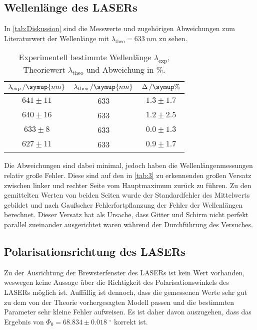 \subsection{Wellenlänge des LASERs}
In \autoref{tab:Diskussion} sind die Messwerte und zugehörigen Abweichungen zum Literaturwert der Wellenlänge mit $\lambda_\text{theo} = \SI{633}{nm}$ \cite{eichler} zu sehen.
\begin{table}[H]
    \centering
    \caption{Experimentell bestimmte Wellenlänge $\lambda_\text{exp}$, Theoriewert $\lambda_\text{theo}$ und Abweichung in \%.}
    \begin{tabular}{c c c}
        \toprule
        {$\lambda_\text{exp}\,/\symup{nm}$} & {$\lambda_\text{theo}\,/\symup{nm}$} & {$\Delta\,/\symup{\%}$}\\
        \midrule
        {$641 \pm 11$} & 633 & {$1.3 \pm 1.7$} \\
        {$640 \pm 16$} & 633 & {$1.2 \pm 2.5$} \\
        {$633 \pm 8$} & 633 & {$0.0 \pm 1.3$} \\
        {$627 \pm 11$} & 633 & {$0.9 \pm 1.7$} \\
        \bottomrule
    \end{tabular}
    \label{tab:Diskussion}
\end{table}
\noindent Die Abweichungen sind dabei minimal, jedoch haben die Wellenlängenmessungen relativ große Fehler. Diese sind auf den in \autoref{tab:3} zu erkennenden großen Versatz zwischen linker und rechter Seite vom Hauptmaximum zurück zu führen. Zu den gemittelten Werten von beiden Seiten wurde der Standardfehler des Mittelwerts gebildet und nach Gaußscher Fehlerfortpflanzung der Fehler der Wellenlängen berechnet. Dieser Versatz hat als Ursache, dass Gitter und Schirm nicht perfekt parallel zueinander ausgerichtet waren während der Durchführung des Versuches.
\subsection{Polarisationsrichtung des LASERs}
Zu der Ausrichtung der Brewsterfenster des LASERs ist kein Wert vorhanden, weswegen keine Aussage über die Richtigkeit des Polarisationswinkels des LASERs möglich ist. Auffällig ist dennoch, dass die gemessenen Werte sehr gut zu dem von der Theorie vorhergesagten Modell passen und die bestimmten Parameter sehr kleine Fehler aufweisen. Es ist daher davon auszugehen, dass das Ergebnis von
$\Phi_0 = 68.834 \pm 0.018 \, \, ^\circ$ korrekt ist.
